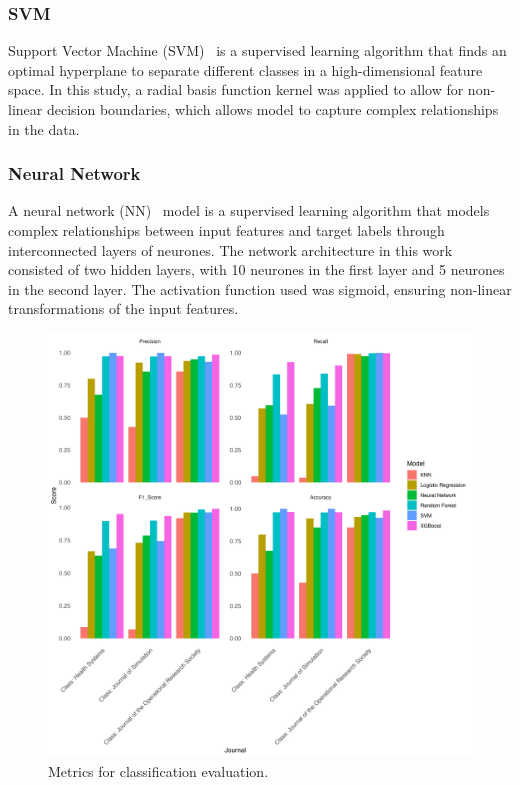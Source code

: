\documentclass[9pt,twocolumn,twoside]{pnas-new}
\begin{document}
\subsubsection*{SVM}
Support Vector Machine (SVM)~\cite{708428} is a supervised learning algorithm that finds an optimal hyperplane to separate different classes in a high-dimensional feature space. In this study, a radial basis function kernel was applied to allow for non-linear decision boundaries, which allows model to capture complex relationships in the data. 


\subsubsection*{Neural Network}
A neural network (NN)~\cite{mcculloch1943logical} model is a supervised learning algorithm that models complex relationships between input features and target labels through interconnected layers of neurones. The network architecture in this work consisted of two hidden layers, with 10 neurones in the first layer and 5 neurones in the second layer. The activation function used was sigmoid, ensuring non-linear transformations of the input features. 

\begin{figure}[H]
\centering
\includegraphics[width=.9\linewidth]{regression/class_metrics_all.png}
\caption{Metrics for classification evaluation.}
\label{fig:class_metrics_all}
\end{figure}
\end{document}
